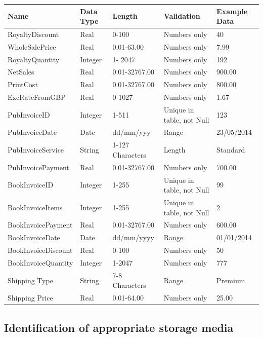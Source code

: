 \begin{center}
\begin{tabular}{|p{3cm}|p{1cm}|p{2.5cm}|p{1.5cm}|p{1.5cm}|}
    \hline
    \textbf{Name} & \textbf{Data Type} & \textbf{Length} & \textbf{Validation} & \textbf{Example Data} \\ \hline
    RoyaltyDiscount & Real & 0-100 & Numbers only & 40 \\ \hline
    WholeSalePrice & Real & 0.01-63.00 & Numbers only & 7.99 \\ \hline
    RoyaltyQuantity & Integer & 1- 2047 & Numbers only & 192 \\ \hline
    NetSales & Real & 0.01-32767.00 & Numbers only & 900.00 \\ \hline
    PrintCost & Real & 0.01-32767.00 & Numbers only & 800.00 \\ \hline
    ExcRateFromGBP & Real & 0-1027 & Numbers only & 1.67 \\ \hline
    PubInvoiceID & Integer & 1-511 &Unique in table, not Null & 123 \\ \hline
    PubInvoiceDate & Date & dd/mm/yyy & Range & 23/05/2014 \\ \hline
    PubInvoiceService & String & 1-127 Characters & Length & Standard \\ \hline
    PubInvoicePayment & Real & 0.01-32767.00 & Numbers only & 700.00 \\ \hline
    BookInvoiceID & Integer & 1-255 & Unique in table, not Null & 99 \\ \hline
    BookInvoiceItems & Integer & 1-255 & Unique in table, not Null & 2 \\ \hline
    BookInvoicePayment & Real & 0.01-32767.00 & Numbers only & 600.00 \\ \hline
    BookInvoiceDate & Date & dd/mm/yyyy & Range & 01/01/2014 \\ \hline
    BookInvoiceDiscount & Real & 0-100 & Numbers only & 50 \\ \hline
    BookInvoiceQuantity & Integer & 1-2047 & Numbers only & 777 \\ \hline
    Shipping Type & String & 7-8 Characters & Range & Premium \\ \hline
    Shipping Price & Real & 0.01-64.00 & Numbers only & 25.00 \\ \hline
    \hline
\end{tabular}
\end{center}

\subsection{Identification of appropriate storage media}

